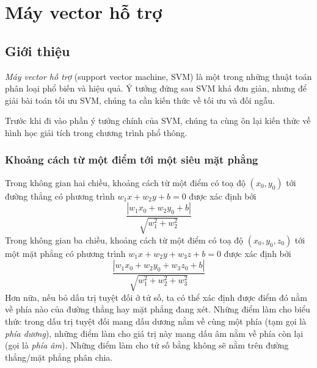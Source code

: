 \chapter{Máy vector hỗ trợ}
\label{cha:svm}



\section{Giới thiệu}
\textit{Máy vector hỗ trợ} (support vector machine, SVM) là một trong những
thuật toán phân loại phổ biến và hiệu quả. Ý tưởng đứng sau SVM khá đơn giản,
nhưng để giải bài toán tối ưu SVM, chúng ta cần kiến thức về tối ưu và đối ngẫu.

Trước khi đi vào phần ý tưởng chính của SVM, chúng ta cùng ôn lại kiến thức về hình học giải tích trong chương trình phổ thông. 
 
 
\subsection{Khoảng cách từ một điểm tới một siêu mặt phẳng}
Trong không gian hai chiều, khoảng cách từ một điểm có toạ độ $(x_0, y_0)$ tới
{đường thẳng} có phương trình $w_1x + w_2y + b = 0$ được xác định bởi
\begin{equation*} 
\frac{|w_1x_0 + w_2y_0 + b|}{\sqrt{w_1^2 + w_2^2}} 
\end{equation*} 
Trong không gian ba chiều, khoảng cách từ một điểm có toạ độ $(x_0, y_0, z_0)$ tới một {mặt phẳng} có phương trình $w_1x + w_2y + w_3 z + b = 0$ được xác định bởi
\begin{equation*} 
\frac{|w_1x_0 + w_2y_0 + w_3z_0 + b|}{\sqrt{w_1^2 + w_2^2 + w_3^2}} 
\end{equation*} 
Hơn nữa, nếu bỏ dấu trị tuyệt đối ở tử số, ta có thể xác định được điểm
đó nằm về phía nào của {đường thẳng} hay {mặt phẳng} đang xét.
Những điểm làm cho biểu thức trong dấu trị tuyệt đối mang dấu dương nằm về
cùng một phía (tạm gọi là \textit{phía dương}), những điểm làm
cho giá trị này mang dấu âm nằm về phía còn lại (gọi là \textit{phía âm}). Những điểm làm cho tử số bằng không sẽ nằm trên đường thẳng/mặt phẳng phân chia.

